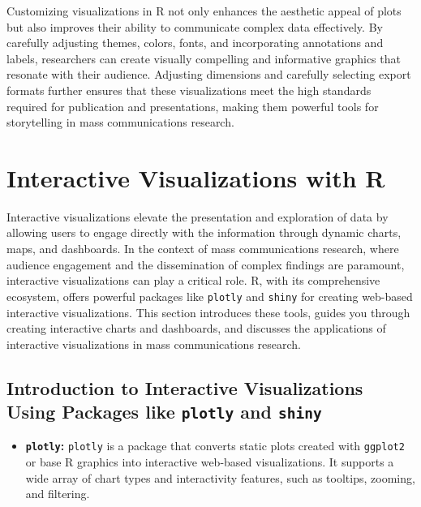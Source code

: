 \documentclass[
]{book}
\providecommand{\tightlist}{%
  \setlength{\itemsep}{0pt}\setlength{\parskip}{0pt}}
\begin{document}
Customizing visualizations in R not only enhances the aesthetic appeal of plots but also improves their ability to communicate complex data effectively. By carefully adjusting themes, colors, fonts, and incorporating annotations and labels, researchers can create visually compelling and informative graphics that resonate with their audience. Adjusting dimensions and carefully selecting export formats further ensures that these visualizations meet the high standards required for publication and presentations, making them powerful tools for storytelling in mass communications research.

\section{Interactive Visualizations with R}\label{interactive-visualizations-with-r}

Interactive visualizations elevate the presentation and exploration of data by allowing users to engage directly with the information through dynamic charts, maps, and dashboards. In the context of mass communications research, where audience engagement and the dissemination of complex findings are paramount, interactive visualizations can play a critical role. R, with its comprehensive ecosystem, offers powerful packages like \texttt{plotly} and \texttt{shiny} for creating web-based interactive visualizations. This section introduces these tools, guides you through creating interactive charts and dashboards, and discusses the applications of interactive visualizations in mass communications research.

\subsection{\texorpdfstring{Introduction to Interactive Visualizations Using Packages like \texttt{plotly} and \texttt{shiny}}{Introduction to Interactive Visualizations Using Packages like plotly and shiny}}\label{introduction-to-interactive-visualizations-using-packages-like-plotly-and-shiny}

\begin{itemize}
\tightlist
\item
  \textbf{\texttt{plotly}:} \texttt{plotly} is a package that converts static plots created with \texttt{ggplot2} or base R graphics into interactive web-based visualizations. It supports a wide array of chart types and interactivity features, such as tooltips, zooming, and filtering.
\end{itemize}
\end{document}
